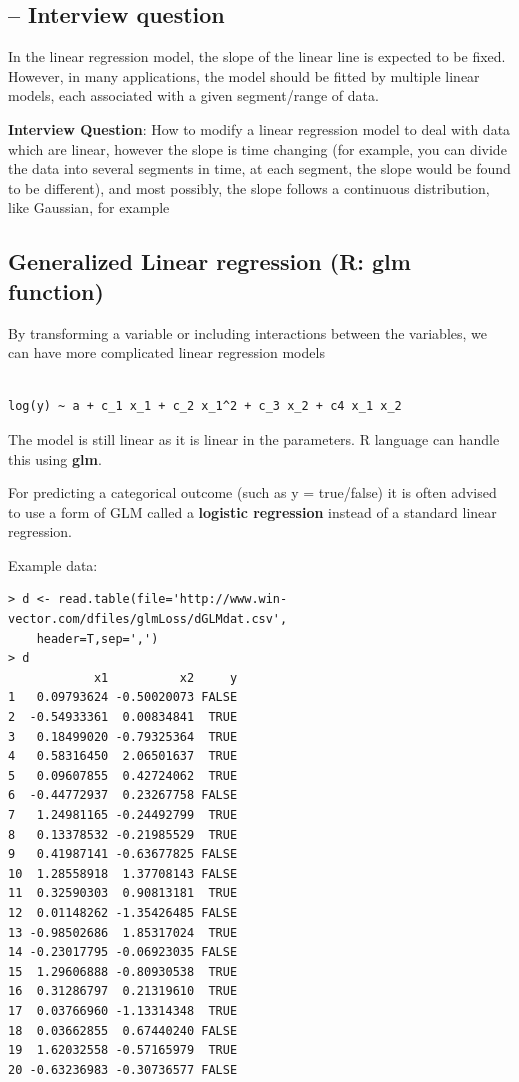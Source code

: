 \subsection{-- Interview question}

In the linear regression model, the slope of the linear line is expected to be
fixed. However, in many applications, the model should be fitted by multiple
linear models, each associated with a given segment/range of data.

{\bf Interview Question}: How to modify a linear regression model to deal with
data which are linear, however the slope is time changing (for example, you can
divide the data into several segments in time, at each segment, the slope would
be found to be different), and most possibly, the slope follows a continuous
distribution, like Gaussian, for example


\subsection{Generalized Linear regression (R: glm function)}
\label{sec:generalized_linear_regression}

By transforming a variable or including interactions between the variables, we
can have more complicated linear regression models
\begin{verbatim}

log(y) ~ a + c_1 x_1 + c_2 x_1^2 + c_3 x_2 + c4 x_1 x_2
\end{verbatim}
The model is still linear as it is linear in the parameters. R language can
handle this using {\bf glm}.

\begin{framed}
For predicting a categorical outcome (such as y = true/false) it is often
advised to use a form of GLM called a {\bf logistic regression} instead of a
standard linear regression. 
\end{framed}

Example data:
\begin{verbatim}
> d <- read.table(file='http://www.win-vector.com/dfiles/glmLoss/dGLMdat.csv',
    header=T,sep=',')
> d
            x1          x2     y
1   0.09793624 -0.50020073 FALSE
2  -0.54933361  0.00834841  TRUE
3   0.18499020 -0.79325364  TRUE
4   0.58316450  2.06501637  TRUE
5   0.09607855  0.42724062  TRUE
6  -0.44772937  0.23267758 FALSE
7   1.24981165 -0.24492799  TRUE
8   0.13378532 -0.21985529  TRUE
9   0.41987141 -0.63677825 FALSE
10  1.28558918  1.37708143 FALSE
11  0.32590303  0.90813181  TRUE
12  0.01148262 -1.35426485 FALSE
13 -0.98502686  1.85317024  TRUE
14 -0.23017795 -0.06923035 FALSE
15  1.29606888 -0.80930538  TRUE
16  0.31286797  0.21319610  TRUE
17  0.03766960 -1.13314348  TRUE
18  0.03662855  0.67440240 FALSE
19  1.62032558 -0.57165979  TRUE
20 -0.63236983 -0.30736577 FALSE
\end{verbatim}

